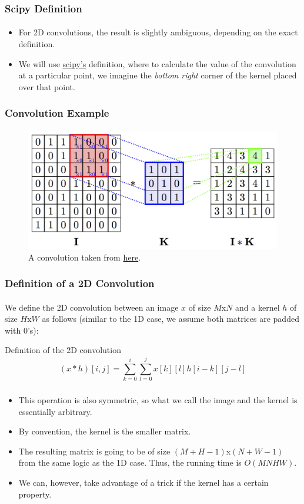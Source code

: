 \documentclass{beamer}                             %
\begin{document}
\begin{frame}
\frametitle{Scipy Definition}
\framesubtitle{}
\begin{itemize}
  \item For 2D convolutions, the result is slightly
  ambiguous, depending on the exact definition.
  \item  We will use
    \href{https://docs.scipy.org/doc/scipy/reference/generated/scipy.signal.convolve2d.html}{scipy's}
    definition, where to calculate the value of the convolution
    at a particular point, we imagine the \textit{bottom
    right} corner of the kernel placed over that point.
\end{itemize}
\end{frame}

\begin{frame}
\frametitle{Convolution Example}
\framesubtitle{}
\begin{figure}[h!]
  \centering
  \includegraphics[scale=1]{conv.png}
  \caption{A convolution taken from \href{https://petar-v.com/GAT/}{here}.}
\end{figure}
\end{frame}

\begin{frame}
\frametitle{Definition of a 2D Convolution}
\framesubtitle{}
We define the 2D convolution between an image \( x \) of size \( M \)x\( N \)
and a kernel \( h \) of size \( H \)x\( W \) as follows
(similar to the 1D case, we assume both matrices are padded with 0's):
\begin{alertblock}{Definition of the 2D convolution}
  \[ (x * h)[i, j] = \sum^i_{k = 0} \sum^j_{l = 0} x[k][l]h[i - k][j - l] \]
\end{alertblock}
\end{frame}

\begin{frame}
\frametitle{}
\framesubtitle{}
\begin{itemize}
  \item This operation is also symmetric, so what we call
    the image and the kernel is essentially arbitrary.
  \item By convention, the kernel is the smaller matrix. 
  \item The resulting matrix is going to be of size
    \( (M + H - 1)\)x\( (N + W - 1) \) from the same logic as
    the 1D case. Thus, the running time is \( O(MNHW) \).
  \item We can, however, take advantage of a
    trick if the kernel has a certain property.
\end{itemize}
\end{frame}
\end{document}
